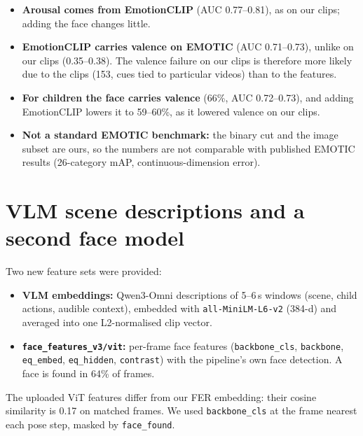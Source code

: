 \documentclass[11pt]{article}
\newcommand{\code}[1]{\texttt{#1}}
\begin{document}
\begin{itemize}
  \item \textbf{Arousal comes from EmotionCLIP} (AUC 0.77--0.81), as on our clips; adding the face changes little.
  \item \textbf{EmotionCLIP carries valence on EMOTIC} (AUC 0.71--0.73), unlike on our clips (0.35--0.38). The valence failure on our clips is therefore more likely due to the clips (153, cues tied to particular videos) than to the features.
  \item \textbf{For children the face carries valence} (66\%, AUC 0.72--0.73), and adding EmotionCLIP lowers it to 59--60\%, as it lowered valence on our clips.
  \item \textbf{Not a standard EMOTIC benchmark:} the binary cut and the image subset are ours, so the numbers are not comparable with published EMOTIC results (26-category mAP, continuous-dimension error).
\end{itemize}

\section{VLM scene descriptions and a second face model}\label{sec:vlm}

Two new feature sets were provided:
\begin{itemize}
  \item \textbf{VLM embeddings:} Qwen3-Omni descriptions of 5--6\,s windows (scene, child actions, audible context), embedded with \code{all-MiniLM-L6-v2} (384-d) and averaged into one L2-normalised clip vector.
  \item \textbf{\code{face\_features\_v3/vit}:} per-frame face features (\code{backbone\_cls}, \code{backbone}, \code{eq\_embed}, \code{eq\_hidden}, \code{contrast}) with the pipeline's own face detection. A face is found in 64\% of frames.
\end{itemize}
The uploaded ViT features differ from our FER embedding: their cosine similarity is 0.17 on matched frames. We used \code{backbone\_cls} at the frame nearest each pose step, masked by \code{face\_found}.
\end{document}
